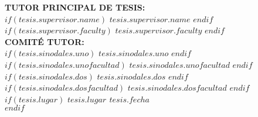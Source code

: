 \begin{titlepage}
\begin{center}
        {\small \textbf{TUTOR PRINCIPAL DE TESIS:}}\\
        {\small $if(tesis.supervisor.name)$ $tesis.supervisor.name$ $endif$}\\
        {\small $if(tesis.supervisor.faculty)$ $tesis.supervisor.faculty$ $endif$}\\[0.5cm]
        
        {\small \textbf{COMITÉ TUTOR:}}\\
        {\small $if(tesis.sinodales.uno)$ $tesis.sinodales.uno$ $endif$} {\small $if(tesis.sinodales.unofacultad)$ $tesis.sinodales.unofacultad$ $endif$}\\
        {\small $if(tesis.sinodales.dos)$ $tesis.sinodales.dos$ $endif$} {\small $if(tesis.sinodales.dosfacultad)$ $tesis.sinodales.dosfacultad$ $endif$}\\
        
        \vfill
        $if(tesis.lugar)$
        {\small \textbf{{$tesis.lugar$} \hfill {$tesis.fecha$}}}\\
        $endif$
        
    \end{center}
\end{titlepage}



\newpage
\begin{center}
\end{center}

